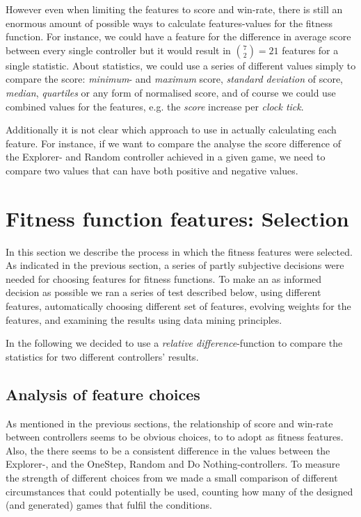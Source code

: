 \documentclass[a4paper,titlepage,final]{report}
\begin{document}
However even when limiting the features to score and win-rate, there is still an enormous amount of possible ways to calculate features-values for the fitness function.
For instance, we could have a feature for the difference in average score between every single controller but it would result in $\binom{7}{2}=21$ features for a single statistic.
About statistics, we could use a series of different values simply to compare the score: \textit{minimum}- and \textit{maximum} score, \textit{standard deviation} of score, \textit{median}, \textit{quartiles} or any form of normalised score, and of course we could  use combined values for the features, e.g. the \textit{score} increase per \textit{clock tick}.

Additionally it is not clear which approach to use in actually calculating each feature. 
For instance, if we want to compare the analyse the score difference of the Explorer- and Random controller achieved in a given game, we need to compare two values that can have both positive and negative values.



\section{Fitness function features: Selection}
\label{sec_task2fitnessSelection}
In this section we describe the process in which the fitness features were selected.
As indicated in the previous section, a series of partly subjective decisions were needed for  choosing features for fitness functions.
To make an as informed decision as possible we ran a series of test described below, using different features, automatically choosing different set of features, evolving weights for the features, and examining the results using data mining principles.

In the following we decided to use a \textit{relative difference}-function to compare the  statistics for two different controllers' results.

\subsection{Analysis of feature choices}
As mentioned in the previous sections, the relationship of score and win-rate between controllers seems to be obvious choices, to to adopt as fitness features.
Also, the there seems to be a consistent difference in the values between the Explorer-, and the OneStep, Random and Do Nothing-controllers.
To measure the strength of different choices from we made a small comparison of different circumstances that could potentially be used, counting how many of the designed (and generated) games that fulfil the conditions.
\end{document}
